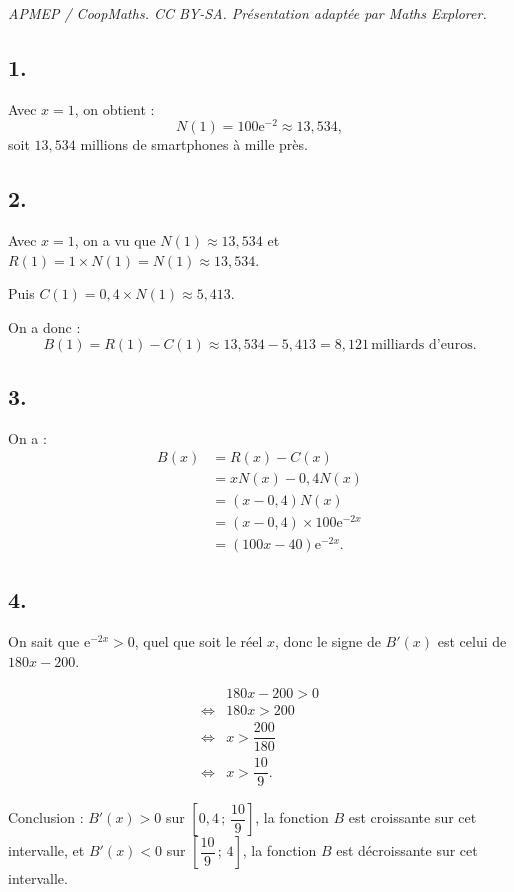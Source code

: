 \documentclass[10pt]{article}
\providecommand{\e}{{\mathrm{e}}}
\begin{document}
\noindent\textit{APMEP / CoopMaths. CC BY-SA. Présentation adaptée par Maths Explorer.}\par\medskip
\subsection*{1.}

Avec \(x = 1\), on obtient :
\[
N(1) = 100\e^{-2} \approx 13{,}534,
\]
soit \(13{,}534\) millions de smartphones à mille près.

\subsection*{2.}

Avec \(x = 1\), on a vu que \(N(1) \approx 13{,}534\) et \(R(1) = 1 \times N(1) = N(1) \approx 13{,}534\).

Puis \(C(1) = 0{,}4 \times N(1) \approx 5{,}413\).

On a donc :
\[
B(1) = R(1) - C(1) \approx 13{,}534 - 5{,}413 = 8{,}121 \, \text{milliards d'euros}.
\]

\subsection*{3.}

On a :
\begin{align*}
B(x) &= R(x) - C(x) \\
&= xN(x) - 0{,}4N(x) \\
&= (x - 0{,}4)N(x) \\
&= (x - 0{,}4) \times 100\e^{-2x} \\
&= (100x - 40)\e^{-2x}.
\end{align*}

\subsection*{4.}

On sait que \(\e^{-2x} > 0\), quel que soit le réel \(x\), donc le signe de \(B'(x)\) est celui de \(180x - 200\).

\begin{align*}
&180x - 200 > 0 \\
\iff &180x > 200 \\
\iff &x > \dfrac{200}{180} \\
\iff &x > \dfrac{10}{9}.
\end{align*}

Conclusion : \(B'(x) > 0\) sur \(\left[0{,}4 \,;\, \dfrac{10}{9}\right]\), la fonction \(B\) est croissante sur cet intervalle, et \(B'(x) < 0\) sur \(\left[\dfrac{10}{9} \,;\, 4\right]\), la fonction \(B\) est décroissante sur cet intervalle.
\end{document}
